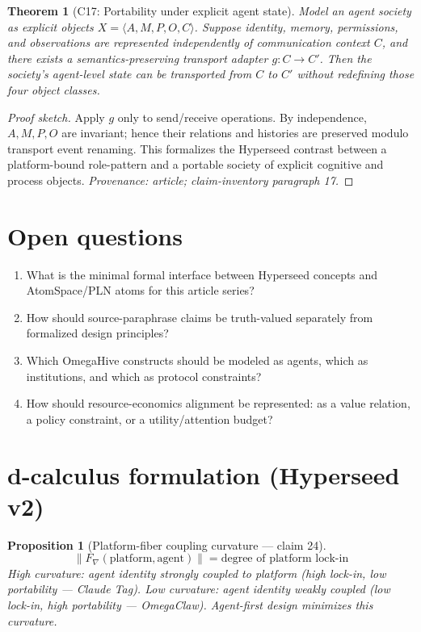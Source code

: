 \documentclass[11pt,a4paper]{article}
\newtheorem{theorem}[definition]{Theorem}
\newtheorem{proposition}[definition]{Proposition}
\begin{document}
\begin{theorem}[C17: Portability under explicit agent state]
Model an agent society as explicit objects
$X=\langle A,M,P,O,C\rangle$.  Suppose identity, memory, permissions, and
observations are represented independently of communication context $C$, and
there exists a semantics-preserving transport adapter $g:C\to C'$.  Then the
society's agent-level state can be transported from $C$ to $C'$ without
redefining those four object classes.
\end{theorem}
\begin{proof}[Proof sketch]
Apply $g$ only to send/receive operations.  By independence, $A,M,P,O$ are
invariant; hence their relations and histories are preserved modulo transport
event renaming.  This formalizes the Hyperseed contrast between a
platform-bound role-pattern and a portable society of explicit cognitive and
process objects.  \emph{Provenance: article; claim-inventory paragraph 17.}
\end{proof}

\section{Open questions}
\begin{enumerate}
\item What is the minimal formal interface between Hyperseed concepts and AtomSpace/PLN atoms for this article series?
\item How should source-paraphrase claims be truth-valued separately from formalized design principles?
\item Which OmegaHive constructs should be modeled as agents, which as institutions, and which as protocol constraints?
\item How should resource-economics alignment be represented: as a value relation, a policy constraint, or a utility/attention budget?
\end{enumerate}

\section{d-calculus formulation (Hyperseed v2)}

\begin{proposition}[Platform-fiber coupling curvature --- claim 24]
\label{prop:platform_curv}
\[
  \|F_\nabla(\text{platform}, \text{agent})\| = \text{degree of
    platform lock-in}
\]
High curvature: agent identity strongly coupled to platform (high
lock-in, low portability --- Claude Tag). Low curvature: agent identity
weakly coupled (low lock-in, high portability --- OmegaClaw). Agent-first
design minimizes this curvature.
\end{proposition}
\end{document}
